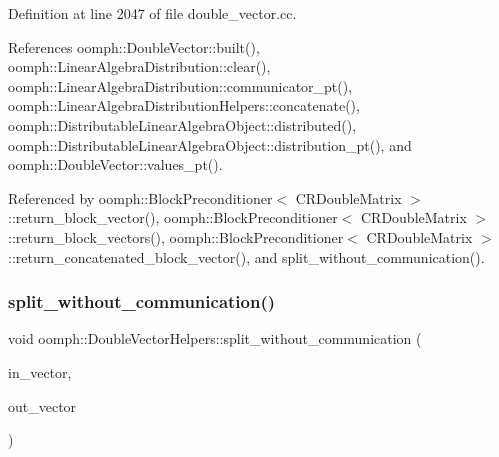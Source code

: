 Definition at line 2047 of file double\+\_\+vector.\+cc.



References oomph\+::\+Double\+Vector\+::built(), oomph\+::\+Linear\+Algebra\+Distribution\+::clear(), oomph\+::\+Linear\+Algebra\+Distribution\+::communicator\+\_\+pt(), oomph\+::\+Linear\+Algebra\+Distribution\+Helpers\+::concatenate(), oomph\+::\+Distributable\+Linear\+Algebra\+Object\+::distributed(), oomph\+::\+Distributable\+Linear\+Algebra\+Object\+::distribution\+\_\+pt(), and oomph\+::\+Double\+Vector\+::values\+\_\+pt().



Referenced by oomph\+::\+Block\+Preconditioner$<$ C\+R\+Double\+Matrix $>$\+::return\+\_\+block\+\_\+vector(), oomph\+::\+Block\+Preconditioner$<$ C\+R\+Double\+Matrix $>$\+::return\+\_\+block\+\_\+vectors(), oomph\+::\+Block\+Preconditioner$<$ C\+R\+Double\+Matrix $>$\+::return\+\_\+concatenated\+\_\+block\+\_\+vector(), and split\+\_\+without\+\_\+communication().

\mbox{\label{namespaceoomph_1_1DoubleVectorHelpers_a66afcc493558424fb89f26bc23dd5bf2}} 
\subsubsection{\texorpdfstring{split\+\_\+without\+\_\+communication()}{split\_without\_communication()}\hspace{0.1cm}{\footnotesize\ttfamily [2/2]}}
{\footnotesize\ttfamily void oomph\+::\+Double\+Vector\+Helpers\+::split\+\_\+without\+\_\+communication (\begin{DoxyParamCaption}\item[{const \hyperlink{classoomph_1_1DoubleVector}{Double\+Vector} \&}]{in\+\_\+vector,  }\item[{\hyperlink{classoomph_1_1Vector}{Vector}$<$ \hyperlink{classoomph_1_1DoubleVector}{Double\+Vector} $>$ \&}]{out\+\_\+vector }\end{DoxyParamCaption})}



